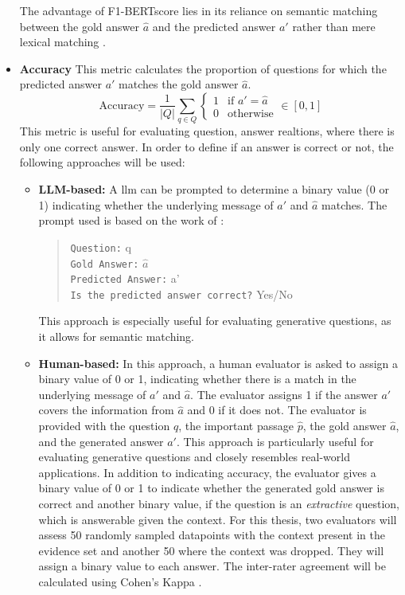 \begin{itemize}
    The advantage of F1-BERTscore lies in its reliance on semantic matching between the gold answer $\hat{a}$ and the predicted answer $a'$ rather than mere lexical matching \cite{zhang_bertscore_2020}.
    

    \item \textbf{Accuracy} This metric calculates the proportion of questions for which the predicted answer $a'$ matches the gold answer $\hat{a}$. 
    \begin{equation}
        \text{Accuracy} = \frac{1}{|Q|} \sum_{q \in Q} 
        \begin{cases}
            1 & \text{if } a' = \hat{a} \\
            0 & \text{otherwise}
        \end{cases}
        \in [0,1]
    \end{equation}
    This metric is useful for evaluating question, answer realtions, where there is only one correct answer. In order to define if an answer is correct or not, the following approaches will be used:
    \begin{itemize}
        \item \textbf{LLM-based:} A \gls{llm} can be prompted to determine a binary value (0 or 1) indicating whether the underlying message of $a'$ and $\hat{a}$ matches. The prompt used is based on the work of \cite{kamalloo_evaluating_2023}:
        \begin{quote}
            \texttt{Question:} q \\
            \texttt{Gold Answer:} $\hat{a}$ \\
            \texttt{Predicted Answer:} a' \\
            \texttt{Is the predicted answer correct?} Yes/No
        \end{quote}
        This approach is especially useful for evaluating generative questions, as it allows for semantic matching.
        \item \textbf{Human-based:} In this approach, a human evaluator is asked to assign a binary value of 0 or 1, indicating whether there is a match in the underlying message of $a'$ and $\hat{a}$. The evaluator assigns 1 if the answer $a'$ covers the information from $\hat{a}$ and 0 if it does not. The evaluator is provided with the question $q$, the important passage $\hat{p}$, the gold answer $\hat{a}$, and the generated answer $a'$. This approach is particularly useful for evaluating generative questions and closely resembles real-world applications. In addition to indicating accuracy, the evaluator gives a binary value of 0 or 1 to indicate whether the generated gold answer is correct and another binary value, if the question is an \textit{extractive} question, which is answerable given the context. For this thesis, two evaluators will assess 50 randomly sampled datapoints with the context present in the evidence set and another 50 where the context was dropped. They will assign a binary value to each answer. The inter-rater agreement will be calculated using Cohen's Kappa \cite{cohen_coefficient_1960}.
    \end{itemize}
\end{itemize}

